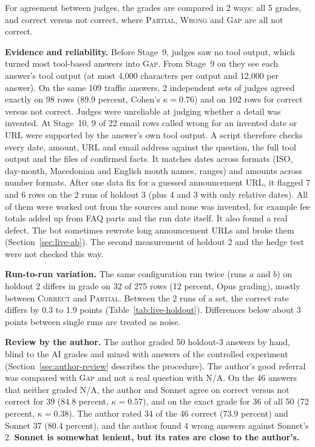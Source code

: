 For agreement between judges, the grades are compared in 2 ways: all 5 grades, and correct versus not correct, where \textsc{Partial}, \textsc{Wrong} and \textsc{Gap} are all not correct.

\textbf{Evidence and reliability.} Before Stage~9, judges saw no tool output, which turned most tool-based answers into \textsc{Gap}. From Stage~9 on they see each answer's tool output (at most 4,000 characters per output and 12,000 per answer). On the same 109 traffic answers, 2 independent sets of judges agreed exactly on 98 rows (89.9 percent, Cohen's $\kappa=0.76$) and on 102 rows for correct versus not correct. Judges were unreliable at judging whether a detail was invented. At Stage~10, 9 of 22 email rows called wrong for an invented date or URL were supported by the answer's own tool output. A script therefore checks every date, amount, URL and email address against the question, the full tool output and the files of confirmed facts. It matches dates across formats (ISO, day-month, Macedonian and English month names, ranges) and amounts across number formats. After one data fix for a guessed announcement URL, it flagged 7 and 6 rows on the 2 runs of holdout 3 (plus 4 and 3 with only relative dates). All of them were worked out from the sources and none was invented, for example fee totals added up from FAQ parts and the run date itself. It also found a real defect. The bot sometimes rewrote long announcement URLs and broke them (Section~\ref{sec:live-ab}). The second measurement of holdout 2 and the hedge test were not checked this way.

\textbf{Run-to-run variation.} The same configuration run twice (runs $a$ and $b$) on holdout 2 differs in grade on 32 of 275 rows (12 percent, Opus grading), mostly between \textsc{Correct} and \textsc{Partial}. Between the 2 runs of a set, the correct rate differs by 0.3 to 1.9 points (Table~\ref{tab:live-holdout}). Differences below about 3 points between single runs are treated as noise.

\textbf{Review by the author.} The author graded 50 holdout-3 answers by hand, blind to the AI grades and mixed with answers of the controlled experiment (Section~\ref{sec:author-review} describes the procedure). The author's good referral was compared with \textsc{Gap} and not a real question with \textsc{N/A}. On the 46 answers that neither graded \textsc{N/A}, the author and Sonnet agree on correct versus not correct for 39 (84.8 percent, $\kappa=0.57$), and on the exact grade for 36 of all 50 (72 percent, $\kappa=0.38$). The author rated 34 of the 46 correct (73.9 percent) and Sonnet 37 (80.4 percent), and the author found 4 wrong answers against Sonnet's 2. \textbf{Sonnet is somewhat lenient, but its rates are close to the author's.}


